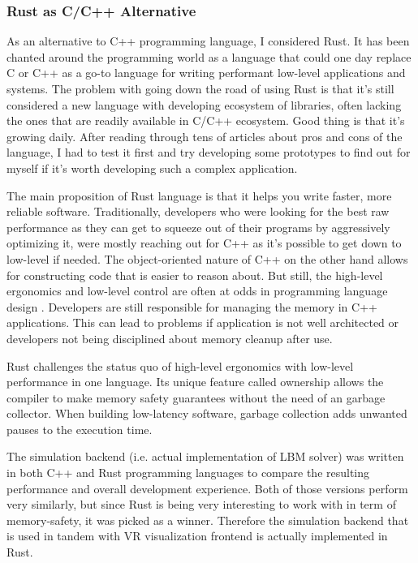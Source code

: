 \subsubsection{Rust as C/C++ Alternative} \label{sec:rust-alt}
 As an alternative to C++ programming language, I considered Rust. It has been chanted around the programming world as a language that could one day replace C or C++ as a go-to language for writing performant low-level applications and systems. The problem with going down the road of using Rust is that it's still considered a new language with developing ecosystem of libraries, often lacking the ones that are readily available in C/C++ ecosystem. Good thing is that it's growing daily. After reading through tens of articles about pros and cons of the language, I had to test it first and try developing some prototypes to find out for myself if it's worth developing such a complex application.

The main proposition of Rust language is that it helps you write faster, more reliable software. Traditionally, developers who were looking for the best raw performance as they can get to squeeze out of their programs by aggressively optimizing it, were mostly reaching out for C++ as it's possible to get down to low-level if needed. The object-oriented nature of C++ on the other hand allows for constructing code that is easier to reason about. But still, the high-level ergonomics and low-level control are often at odds in programming language design \citep{steveklabnik2018}. Developers are still responsible for managing the memory in C++ applications. This can lead to problems if application is not well architected or developers not being disciplined about memory cleanup after use.

Rust challenges the status quo of high-level ergonomics with low-level performance in one language. Its unique feature called ownership allows the compiler to make memory safety guarantees without the need of an garbage collector. When building low-latency software, garbage collection adds unwanted pauses to the execution time. 

The simulation backend (i.e. actual implementation of LBM solver) was written in both C++ and Rust programming languages to compare the resulting performance and overall development experience. Both of those versions perform very similarly, but since Rust is being very interesting to work with in term of memory-safety, it was picked as a winner. Therefore the simulation backend that is used in tandem with VR visualization frontend is actually implemented in Rust. 

